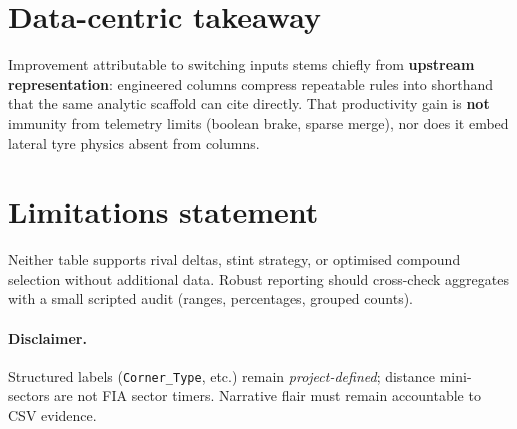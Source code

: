 \documentclass[11pt,a4paper]{article}
\begin{document}
\section{Data-centric takeaway}

Improvement attributable to switching inputs stems chiefly from \textbf{upstream representation}: engineered columns compress repeatable rules into shorthand that the same analytic scaffold can cite directly. That productivity gain is \textbf{not} immunity from telemetry limits (boolean brake, sparse merge), nor does it embed lateral tyre physics absent from columns.

\section{Limitations statement}

Neither table supports rival deltas, stint strategy, or optimised compound selection without additional data. Robust reporting should cross-check aggregates with a small scripted audit (ranges, percentages, grouped counts).

\paragraph{Disclaimer.}
Structured labels (\texttt{Corner\_Type}, etc.) remain \emph{project-defined}; distance mini-sectors are not FIA sector timers. Narrative flair must remain accountable to CSV evidence.
\end{document}
